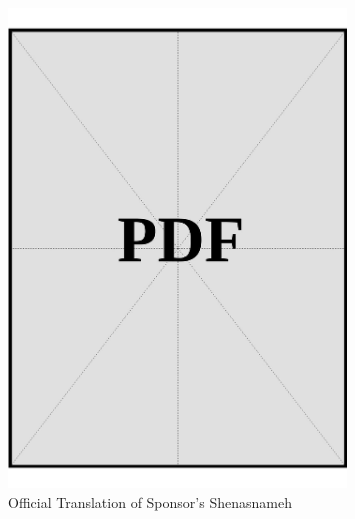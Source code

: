 \begin{figure}[h]
    \centering
    \includegraphics[page=1, width=0.8\textwidth]{../application-docs/sponsor/identification/shenasnameh/official-translations.pdf}
    \caption{Official Translation of Sponsor's Shenasnameh}
    \label{fig:sponsor-shenasnameh-official-translation}
\end{figure}
\vspace*{\fill}
\clearpage


